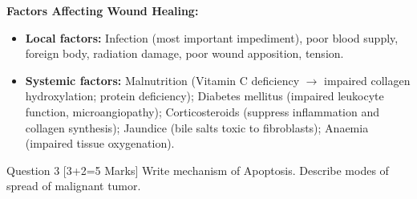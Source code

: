 \documentclass[11pt,a4paper]{article}
\begin{document}
\begin{ansbox}
\textbf{Factors Affecting Wound Healing:}
\begin{itemize}[leftmargin=*]
    \item \textbf{Local factors:} Infection (most important impediment), poor blood supply, foreign body, radiation damage, poor wound apposition, tension.
    \item \textbf{Systemic factors:} Malnutrition (Vitamin C deficiency $\rightarrow$ impaired collagen hydroxylation; protein deficiency); Diabetes mellitus (impaired leukocyte function, microangiopathy); Corticosteroids (suppress inflammation and collagen synthesis); Jaundice (bile salts toxic to fibroblasts); Anaemia (impaired tissue oxygenation).
\end{itemize}
\end{ansbox}

\begin{qbox}{Question 3 [3+2=5 Marks]}
Write mechanism of Apoptosis. Describe modes of spread of malignant tumor.
\end{qbox}
\end{document}
